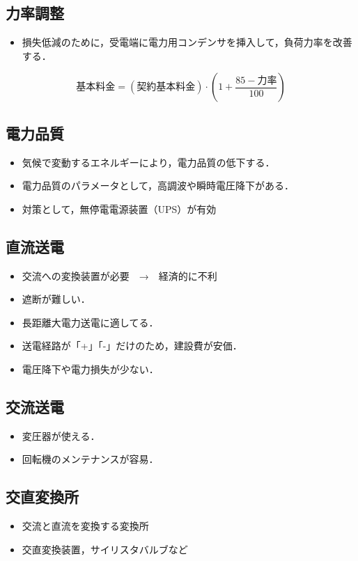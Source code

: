 \subsection{力率調整}
\begin{itemize}
  \item 損失低減のために，受電端に電力用コンデンサを挿入して，負荷力率を改善する．
\end{itemize}
\begin{equation}
  \mbox{基本料金} = (\mbox{契約基本料金}) \cdot (1 + \frac{85 - \mbox{力率}}{100})
\end{equation}

\subsection{電力品質}
\begin{itemize}
  \item 気候で変動するエネルギーにより，電力品質の低下する．
  \item 電力品質のパラメータとして，高調波や瞬時電圧降下がある．
  \item 対策として，無停電電源装置（UPS）が有効
\end{itemize}

\subsection{直流送電}
\begin{itemize}
  \item 交流への変換装置が必要　→　経済的に不利
  \item 遮断が難しい．
  \item 長距離大電力送電に適してる．
  \item 送電経路が「+」「-」だけのため，建設費が安価．
  \item 電圧降下や電力損失が少ない．
\end{itemize}

\subsection{交流送電}
\begin{itemize}
  \item 変圧器が使える．
  \item 回転機のメンテナンスが容易．
\end{itemize}

\subsection{交直変換所}
\begin{itemize}
  \item 交流と直流を変換する変換所
  \item 交直変換装置，サイリスタバルブなど
\end{itemize}


